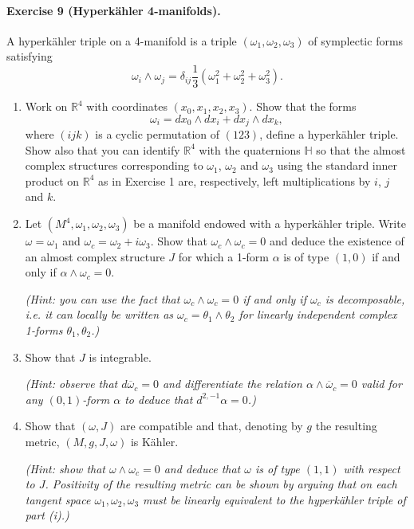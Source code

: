 \documentclass{article}
\theoremstyle{definition}
\renewcommand{\H}{\mathbb{H}}
\newcommand{\R}{\mathbb{R}}
\begin{document}
\paragraph{Exercise 9 {\normalfont(Hyperk\"ahler 4-manifolds)}.} A hyperk\"ahler
triple on a 4-manifold is a triple $(\omega_1,\omega_2,\omega_3)$ of symplectic
forms satisfying
\begin{equation*}
    \omega_i\wedge\omega_j
        = \delta_{ij}\frac{1}{3}(\omega_1^2+\omega_2^2+\omega_3^2).
\end{equation*}
\begin{enumerate}
    \item Work on $\R^4$ with coordinates $(x_0,x_1,x_2,x_3)$. Show that the
        forms
        \begin{equation*}
            \omega_i=dx_0\wedge dx_i+dx_j\wedge dx_k,
        \end{equation*}
        where $(ijk)$ is a cyclic permutation of $(123)$, define a
        hyperk\"ahler triple. Show also that you can identify $\R^4$ with the
        quaternions $\H$ so that the almost complex structures corresponding to 
        $\omega_1$, $\omega_2$ and $\omega_3$ using the standard inner product
        on $\R^4$ as in Exercise 1 are, respectively, left multiplications by
        $i$, $j$ and $k$.

    \item Let $(M^4,\omega_1,\omega_2,\omega_3)$ be a manifold endowed with a
        hyperk\"ahler triple.  Write $\omega=\omega_1$ and
        $\omega_c=\omega_2+i\omega_3$. Show that $\omega_c\wedge\omega_c=0$ and
        deduce the existence of an almost complex structure $J$ for which a
        1-form $\alpha$ is of type $(1,0)$ if and only if
        $\alpha\wedge\omega_c=0$.

        \textit{(Hint: you can use the fact that $\omega_c\wedge\omega_c=0$ if
        and only if $\omega_c$ is decomposable, \emph{i.e.} it can locally be
        written as $\omega_c=\theta_1\wedge\theta_2$ for linearly independent
        complex 1-forms $\theta_1,\theta_2$.)}

    \item Show that $J$ is integrable.

        \textit{(Hint: observe that $d\overline\omega_c=0$ and differentiate
        the relation $\alpha\wedge\overline\omega_c=0$ valid for any
        $(0,1)$-form $\alpha$ to deduce that $d^{2,-1}\alpha=0$.)}

    \item Show that $(\omega,J)$ are compatible and that, denoting by $g$ the
        resulting metric, $(M,g,J,\omega)$ is K\"ahler.

        \textit{(Hint: show that $\omega\wedge\omega_c=0$ and deduce that
        $\omega$ is of type $(1,1)$ with respect to $J$. Positivity of the
        resulting metric can be shown by arguing that on each tangent space
        $\omega_1,\omega_2,\omega_3$ must be linearly equivalent to the
        hyperk\"ahler triple of part (i).)}
\end{enumerate}
\end{document}
